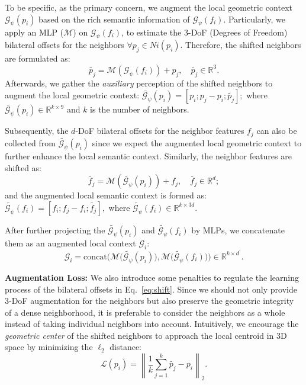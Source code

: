 \documentclass[10pt,twocolumn,letterpaper]{article}
\begin{document}
To be specific, as the primary concern, we augment the local geometric context ${\mathcal{G}_\psi}(p_i)$ based on the rich semantic information of ${\mathcal{G}_\psi}(f_i)$. Particularly, we apply an MLP ($\mathcal{M}$) on ${\mathcal{G}_\psi}(f_i)$, to estimate the 3-DoF (Degrees of Freedom) bilateral offsets for the neighbors ${\forall}p_j\in Ni(p_i)$. Therefore, the shifted neighbors are formulated as:
\begin{equation}
\label{eq:shift}
    \tilde{p_j} = \mathcal{M}({\mathcal{G}_\psi}(f_i)) + p_j, \quad {\tilde{p_j}}\in\mathbb{R}^{3}.
\end{equation}
Afterwards, we gather the \emph{auxiliary} perception of the shifted neighbors to augment the local geometric context:
$
    {\tilde{\mathcal{G}_\psi}(p_i)} = [p_i; p_j-p_i; \tilde{p_j}];
$
where ${\tilde{\mathcal{G}_\psi}(p_i)}\in\mathbb{R}^{k\times 9}$ and $k$ is the number of neighbors.

Subsequently, the $d$-DoF bilateral offsets for the neighbor features $f_j$ can also be collected from ${\tilde{\mathcal{G}_\psi}(p_i)}$ since we expect the augmented local geometric context to further enhance the local semantic context. Similarly, the neighbor features are shifted as:
\begin{equation}
\label{eq:shift_feat}
    \tilde{f_j} = \mathcal{M}({\tilde{\mathcal{G}_\psi}(p_i)}) + f_j, \quad {\tilde{f_j}}\in\mathbb{R}^{d};
\end{equation}
and the augmented local semantic context is formed as: 
$
    {\tilde{\mathcal{G}_\psi}(f_i)} = [f_i; f_j-f_i; \tilde{f_j}],
$
where ${\tilde{\mathcal{G}_\psi}(f_i)}\in\mathbb{R}^{k\times 3d}.$ 

After further projecting the ${\tilde{\mathcal{G}_\psi}(p_i)}$ and ${\tilde{\mathcal{G}_\psi}(f_i)}$ by MLPs, we concatenate them as an augmented local context $\mathcal{G}_i$:
\begin{equation}
    \mathcal{G}_i = \mathrm{concat}\Big(\mathcal{M}\big({\tilde{\mathcal{G}_\psi}(p_i)}\big) , \mathcal{M}\big({\tilde{\mathcal{G}_\psi}(f_i)}\big)\Big)\in\mathbb{R}^{k\times d^{\prime}}.
\end{equation}

\noindent \textbf{Augmentation Loss:} 
We also introduce some penalties to regulate the learning process of the bilateral offsets in Eq.~\ref{eq:shift}. Since we should not only provide 3-DoF augmentation for the neighbors but also preserve the geometric integrity of a dense neighborhood, it is preferable to consider the neighbors as a whole instead of taking individual neighbors into account. Intuitively, we encourage the \emph{geometric center} of the shifted neighbors to approach the local centroid in 3D space by minimizing the $\ell_2$ distance:
\begin{equation}
\label{eq:pointloss}
    \mathcal{L}(p_i) = {\left\lVert \textstyle{\frac{1}{k}} \sum_{j=1}^{k} \tilde{p_j} - p_i \right\rVert}_2.
\end{equation}
\end{document}
